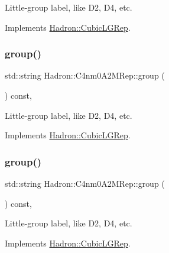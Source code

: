 Little-\/group label, like D2, D4, etc. 

Implements \mbox{\hyperlink{structHadron_1_1CubicLGRep_a9bdb14b519a611d21379ed96a3a9eb41}{Hadron\+::\+Cubic\+L\+G\+Rep}}.

\mbox{\label{structHadron_1_1C4nm0A2MRep_a45255be18f2b1908fcae5e6801e6778f}} 
\subsubsection{\texorpdfstring{group()}{group()}\hspace{0.1cm}{\footnotesize\ttfamily [2/3]}}
{\footnotesize\ttfamily std\+::string Hadron\+::\+C4nm0\+A2\+M\+Rep\+::group (\begin{DoxyParamCaption}{ }\end{DoxyParamCaption}) const\hspace{0.3cm}{\ttfamily [inline]}, {\ttfamily [virtual]}}

Little-\/group label, like D2, D4, etc. 

Implements \mbox{\hyperlink{structHadron_1_1CubicLGRep_a9bdb14b519a611d21379ed96a3a9eb41}{Hadron\+::\+Cubic\+L\+G\+Rep}}.

\mbox{\label{structHadron_1_1C4nm0A2MRep_a45255be18f2b1908fcae5e6801e6778f}} 
\subsubsection{\texorpdfstring{group()}{group()}\hspace{0.1cm}{\footnotesize\ttfamily [3/3]}}
{\footnotesize\ttfamily std\+::string Hadron\+::\+C4nm0\+A2\+M\+Rep\+::group (\begin{DoxyParamCaption}{ }\end{DoxyParamCaption}) const\hspace{0.3cm}{\ttfamily [inline]}, {\ttfamily [virtual]}}

Little-\/group label, like D2, D4, etc. 

Implements \mbox{\hyperlink{structHadron_1_1CubicLGRep_a9bdb14b519a611d21379ed96a3a9eb41}{Hadron\+::\+Cubic\+L\+G\+Rep}}.

\mbox{\label{structHadron_1_1C4nm0A2MRep_a32eaa35da406679229721f90a391ff76}} 
